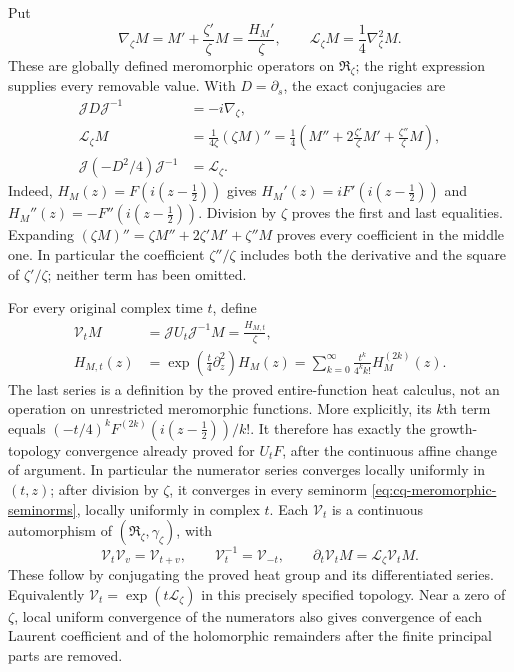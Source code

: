 Put
\[
 \nabla_\zeta M=M'+\frac{\zeta'}{\zeta}M
             =\frac{H_M'}{\zeta},
 \qquad \mathcal L_\zeta M=\frac14\nabla_\zeta^2M.
\]
These are globally defined meromorphic operators on
$\mathfrak R_\zeta$; the right expression supplies every
removable value. With $D=\partial_s$, the exact conjugacies are
\begin{equation}\label{eq:cq-meromorphic-generator}
 \begin{aligned}
 \mathscr JD\mathscr J^{-1}&=-i\nabla_\zeta,\\
 \mathcal L_\zeta M
 &=\frac{1}{4\zeta}(\zeta M)''
  =\frac14\left(M''+2\frac{\zeta'}{\zeta}M'
                         +\frac{\zeta''}{\zeta}M\right),\\
 \mathscr J(-D^2/4)\mathscr J^{-1}&=\mathcal L_\zeta.
 \end{aligned}
\end{equation}
Indeed, $H_M(z)=F(i(z-\tfrac12))$ gives
$H_M'(z)=iF'(i(z-\tfrac12))$ and
$H_M''(z)=-F''(i(z-\tfrac12))$. Division by $\zeta$ proves
the first and last equalities. Expanding
$(\zeta M)''=\zeta M''+2\zeta'M'+\zeta''M$ proves every
coefficient in the middle one. In particular the coefficient
$\zeta''/\zeta$ includes both the derivative and the square
of $\zeta'/\zeta$; neither term has been omitted.

For every original complex time $t$, define
\begin{equation}\label{eq:cq-meromorphic-heat}
 \begin{aligned}
 \mathcal V_tM
 &=\mathscr JU_t\mathscr J^{-1}M
   =\frac{H_{M,t}}{\zeta},\\
 H_{M,t}(z)
 &=\exp\!\left(\frac t4\partial_z^2\right)H_M(z)
   =\sum_{k=0}^{\infty}
              \frac{t^k}{4^k k!}H_M^{(2k)}(z).
 \end{aligned}
\end{equation}
The last series is a definition by the proved entire-function
heat calculus, not an operation on unrestricted meromorphic
functions. More explicitly, its $k$th term equals
$(-t/4)^kF^{(2k)}(i(z-\tfrac12))/k!$.
It therefore has exactly the growth-topology convergence already
proved for $U_tF$, after the continuous affine change of argument.
In particular the numerator series converges locally uniformly in
$(t,z)$; after division by $\zeta$, it converges in every seminorm
\eqref{eq:cq-meromorphic-seminorms}, locally uniformly in complex $t$.
Each $\mathcal V_t$ is a continuous automorphism of
$(\mathfrak R_\zeta,\gamma_\zeta)$, with
\[
 \mathcal V_t\mathcal V_v=\mathcal V_{t+v},\qquad
 \mathcal V_t^{-1}=\mathcal V_{-t},\qquad
 \partial_t\mathcal V_tM=\mathcal L_\zeta\mathcal V_tM.
\]
These follow by conjugating the proved heat group and its
differentiated series. Equivalently
$\mathcal V_t=\exp(t\mathcal L_\zeta)$ in this precisely
specified topology. Near a zero of $\zeta$, local uniform
convergence of the numerators also gives convergence of each
Laurent coefficient and of the holomorphic remainders after the
finite principal parts are removed.

